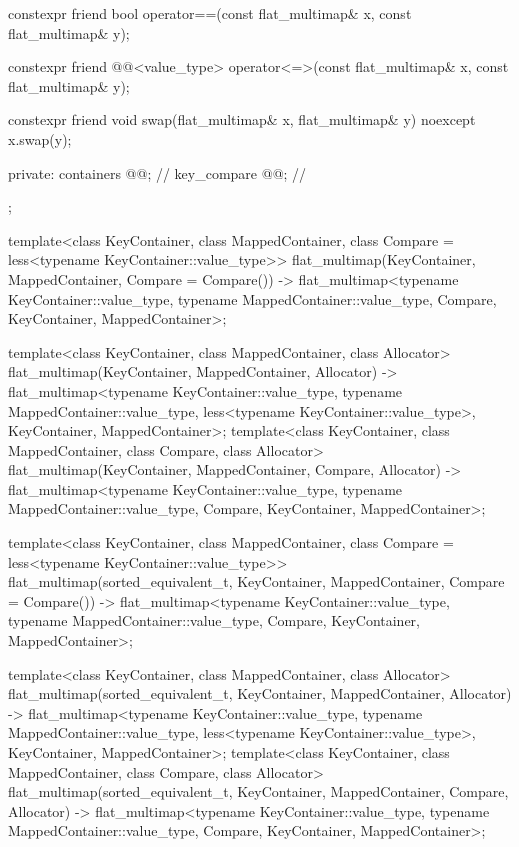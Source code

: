 \begin{codeblock}
{{    constexpr friend bool operator==(const flat_multimap& x, const flat_multimap& y);

    constexpr friend @@<value_type>
      operator<=>(const flat_multimap& x, const flat_multimap& y);

    constexpr friend void swap(flat_multimap& x, flat_multimap& y) noexcept
      { x.swap(y); }

  private:
    containers @@;               // \expos
    key_compare @@;        // \expos
  };

  template<class KeyContainer, class MappedContainer,
           class Compare = less<typename KeyContainer::value_type>>
    flat_multimap(KeyContainer, MappedContainer, Compare = Compare())
      -> flat_multimap<typename KeyContainer::value_type, typename MappedContainer::value_type,
                       Compare, KeyContainer, MappedContainer>;

  template<class KeyContainer, class MappedContainer, class Allocator>
    flat_multimap(KeyContainer, MappedContainer, Allocator)
      -> flat_multimap<typename KeyContainer::value_type, typename MappedContainer::value_type,
                       less<typename KeyContainer::value_type>, KeyContainer, MappedContainer>;
  template<class KeyContainer, class MappedContainer, class Compare, class Allocator>
    flat_multimap(KeyContainer, MappedContainer, Compare, Allocator)
      -> flat_multimap<typename KeyContainer::value_type, typename MappedContainer::value_type,
                       Compare, KeyContainer, MappedContainer>;

  template<class KeyContainer, class MappedContainer,
           class Compare = less<typename KeyContainer::value_type>>
    flat_multimap(sorted_equivalent_t, KeyContainer, MappedContainer, Compare = Compare())
      -> flat_multimap<typename KeyContainer::value_type, typename MappedContainer::value_type,
                       Compare, KeyContainer, MappedContainer>;

  template<class KeyContainer, class MappedContainer, class Allocator>
    flat_multimap(sorted_equivalent_t, KeyContainer, MappedContainer, Allocator)
      -> flat_multimap<typename KeyContainer::value_type, typename MappedContainer::value_type,
                       less<typename KeyContainer::value_type>, KeyContainer, MappedContainer>;
  template<class KeyContainer, class MappedContainer, class Compare, class Allocator>
    flat_multimap(sorted_equivalent_t, KeyContainer, MappedContainer, Compare, Allocator)
      -> flat_multimap<typename KeyContainer::value_type, typename MappedContainer::value_type,
                       Compare, KeyContainer, MappedContainer>;

}
\end{codeblock}
